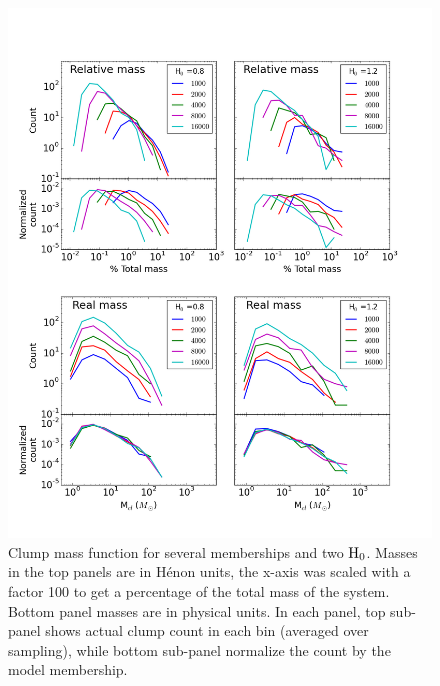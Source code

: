 \begin{figure}
\begin{center}
\includegraphics[width=\columnwidth]{Figures/2_ClumpMF_N.png}
\end{center}
\caption[Clump mass function for several memberships and two $\Hub_0$]{Clump mass function for several memberships and two $\Hub_0$. Masses in the top panels are in H\'enon units, the x-axis was scaled with a factor 100 to get a percentage of the total mass of the system. Bottom panel masses are in physical units. In each panel, top sub-panel shows actual clump count in each bin (averaged over sampling), while bottom sub-panel normalize the count by the model membership. }
\label{Fig:2_ClumpMF_N}
\end{figure} 

